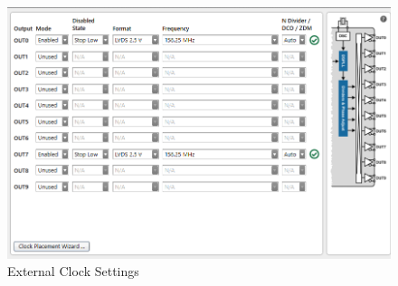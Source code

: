 \documentclass[oneside]{discothesis}
\begin{document}
\begin{figure}[ht]
    \centering
    \hspace*{-2cm}\includegraphics[width=1.3\linewidth]{img/clock_settings.png}
    \caption{External Clock Settings}%
    \label{fig:clock_settings}
\end{figure}

\cleardoublepage
\end{document}
